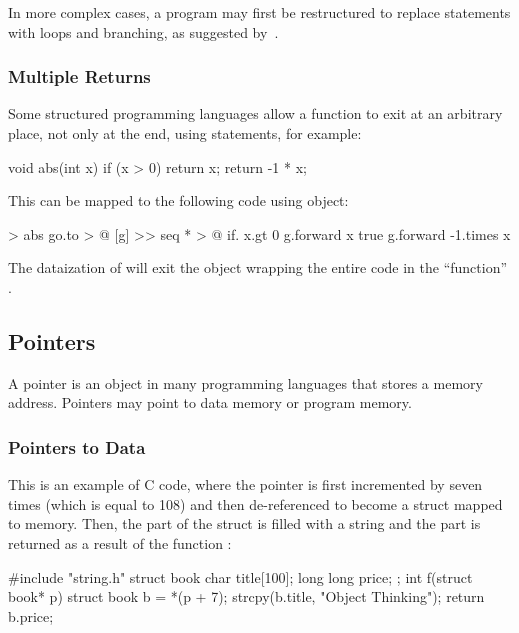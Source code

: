 \documentclass[sigplan,nonacm]{acmart}
\begin{document}
In more complex cases, a program may first be restructured to replace  statements with loops and branching, as suggested by~\citet{williams1985restructuring,pan1996formal,erosa1994taming,ceccato2008goto}.

\subsubsection{Multiple Returns}

Some structured programming languages allow a function to exit at an arbitrary place, not only at the end, using  statements, for example:

\begin{ffcode}
void abs(int x) {
  if (x > 0) {
    return x;
  }
  return -1 * x;
}
\end{ffcode}

This can be mapped to the following \eolang{} code using  object:

\begin{ffcode}
[x] > abs
  go.to > @
    [g] >>
      seq * > @
        if.
          x.gt 0
          g.forward x
          true
        g.forward
          -1.times x
\end{ffcode}

The dataization of  will exit the  object wrapping the entire code in the ``function'' .

\subsection{Pointers}
\label{sec:pointers}

A pointer is an object in many programming languages that stores a memory address.
Pointers may point to data memory or program memory.

\subsubsection{Pointers to Data}

This is an example of C code, where the pointer  is first incremented by seven times  (which is equal to 108) and then de-referenced to become a struct  mapped to memory.
Then, the  part of the struct is filled with a string and the  part is returned as a result of the function :

\begin{ffcode}
#include "string.h"
struct book {
  char title[100];
  long long price;
};
int f(struct book* p) {
  struct book b = *(p + 7);
  strcpy(b.title, "Object Thinking");
  return b.price;
}
\end{ffcode}
\end{document}

